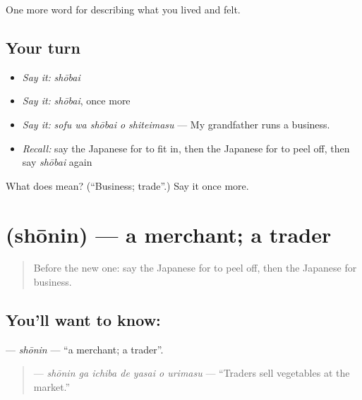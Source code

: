 \begin{grammarlens}[title={What you've built}]
One more word for describing what you lived and felt.
\end{grammarlens}

\subsection*{Your turn}
\begin{itemize}
\raggedright
  \item \emph{Say it:} \emph{shōbai}
  \item \emph{Say it:} \emph{shōbai}, once more
  \item \emph{Say it:} \emph{sofu wa shōbai o shiteimasu} — My grandfather runs a business.
  \item \emph{Recall:} say the Japanese for to fit in, then the Japanese for to peel off, then say \emph{shōbai} again
\end{itemize}

\begin{tcolorbox}[breakable,colback=teal!4,colframe=teal!35!black,title={Before you move on}]
What does  mean? (\textquotedblleft{}Business; trade\textquotedblright{}.) Say it once more.
\end{tcolorbox}
\section[\texorpdfstring{\ja{しょうにん} (shōnin)}{しょうにん (shōnin)}]{ (shōnin) — a merchant; a trader}

\label{lesson:JA-C487-shounin}



\begin{quote}
Before the new one: say the Japanese for to peel off, then the Japanese for business.
\end{quote}

\subsection*{You'll want to know: }
\textbf{} — \emph{shōnin} — \textquotedblleft{}a merchant; a trader\textquotedblright{}.

\begin{quote}
\textbf{   } — \emph{shōnin ga ichiba de yasai o urimasu} — \textquotedblleft{}Traders sell vegetables at the market.\textquotedblright{}
\end{quote}

